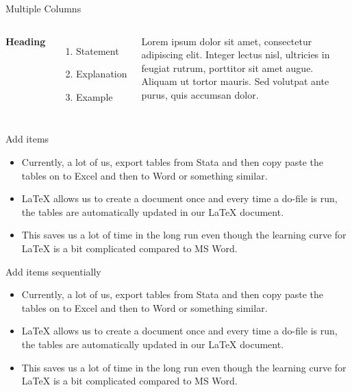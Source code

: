 \documentclass[aspectratio=169]{beamer}
\begin{document}
\begin{frame}{Multiple Columns}
\begin{columns}[c] %

	\textbf{Heading}
	\begin{enumerate}
		\item Statement
		\item Explanation
		\item Example
	\end{enumerate}

	Lorem ipsum dolor sit amet, consectetur adipiscing elit. Integer lectus nisl, ultricies in feugiat rutrum, porttitor sit amet augue. Aliquam ut tortor mauris. Sed volutpat ante purus, quis accumsan dolor.

\end{columns}
\end{frame}

\begin{frame}{Add items}

\begin{itemize}
	\item Currently, a lot of us, export tables from Stata and then copy paste the tables on to Excel and then to Word or something similar.
	\item {\LaTeX} allows us to create a document once and every time a do-file is run, the tables are automatically updated in our {\LaTeX} document.
	\item This saves us a lot of time in the long run even though the learning curve for {\LaTeX} is a bit complicated compared to MS Word.

\end{itemize}
\end{frame}

\begin{frame}{Add items sequentially}

	\begin{itemize}
		\item<1->Currently, a lot of us, export tables from Stata and then copy paste the tables on to Excel and then to Word or something similar.
		\item<2->{\LaTeX} allows us to create a document once and every time a do-file is run, the tables are automatically updated in our {\LaTeX} document.
		\item<3->This saves us a lot of time in the long run even though the learning curve for {\LaTeX} is a bit complicated compared to MS Word.

	\end{itemize}
\end{frame}
\end{document}
